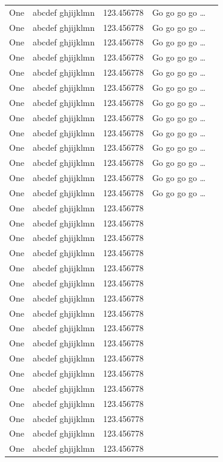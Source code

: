 \documentclass[phd,showframe]{ndsu-thesis-2022}
\begin{document}
\begin{longtable}{l l l l r}
One & abcdef ghjijklmn & 123.456778  & Go go go go \ldots \\
One & abcdef ghjijklmn & 123.456778  & Go go go go \ldots \\
One & abcdef ghjijklmn & 123.456778  & Go go go go \ldots \\
One & abcdef ghjijklmn & 123.456778  & Go go go go \ldots \\
One & abcdef ghjijklmn & 123.456778  & Go go go go \ldots \\
One & abcdef ghjijklmn & 123.456778  & Go go go go \ldots \\
One & abcdef ghjijklmn & 123.456778  & Go go go go \ldots \\
One & abcdef ghjijklmn & 123.456778  & Go go go go \ldots \\
One & abcdef ghjijklmn & 123.456778  & Go go go go \ldots \\
One & abcdef ghjijklmn & 123.456778  & Go go go go \ldots \\
One & abcdef ghjijklmn & 123.456778  & Go go go go \ldots \\
One & abcdef ghjijklmn & 123.456778  & Go go go go \ldots \\
One & abcdef ghjijklmn & 123.456778  & Go go go go \ldots \\
One & abcdef ghjijklmn & 123.456778 \\
One & abcdef ghjijklmn & 123.456778 \\
One & abcdef ghjijklmn & 123.456778 \\
One & abcdef ghjijklmn & 123.456778 \\
One & abcdef ghjijklmn & 123.456778 \\
One & abcdef ghjijklmn & 123.456778 \\
One & abcdef ghjijklmn & 123.456778 \\
One & abcdef ghjijklmn & 123.456778 \\
One & abcdef ghjijklmn & 123.456778 \\
One & abcdef ghjijklmn & 123.456778 \\
One & abcdef ghjijklmn & 123.456778 \\
One & abcdef ghjijklmn & 123.456778 \\
One & abcdef ghjijklmn & 123.456778 \\
One & abcdef ghjijklmn & 123.456778 \\
One & abcdef ghjijklmn & 123.456778 \\
One & abcdef ghjijklmn & 123.456778 \\
One & abcdef ghjijklmn & 123.456778 \\

\end{longtable}
\end{document}

